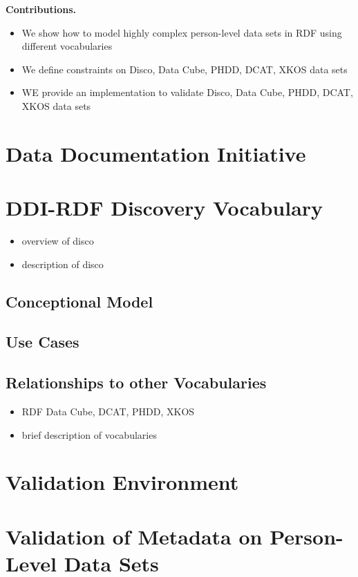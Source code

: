 \documentclass{elsart3p}    %
\begin{document}
\textbf{Contributions.}
\begin{itemize}
  \item We show how to model highly complex person-level data sets in RDF using different vocabularies 
  \item We define constraints on Disco, Data Cube, PHDD, DCAT, XKOS data sets
	\item WE provide an implementation to validate Disco, Data Cube, PHDD, DCAT, XKOS data sets 
\end{itemize}

\section{Data Documentation Initiative}

\section{DDI-RDF Discovery Vocabulary}

\begin{itemize}
  \item overview of disco
	\item description of disco
\end{itemize}

\subsection{Conceptional Model}

\subsection{Use Cases}

\subsection{Relationships to other Vocabularies}

\begin{itemize}
	\item RDF Data Cube, DCAT, PHDD, XKOS
	\item brief description of vocabularies
\end{itemize}

\section{Validation Environment}

\section{Validation of Metadata on Person-Level Data Sets}
\end{document}
